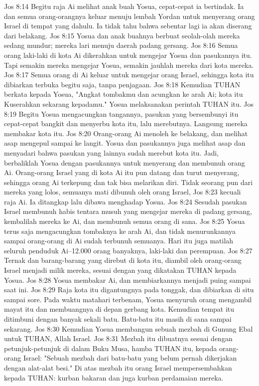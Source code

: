Jos 8:14  Begitu raja Ai melihat anak buah Yosua, cepat-cepat ia bertindak. Ia dan semua orang-orangnya keluar menuju lembah Yordan untuk menyerang orang Israel di tempat yang dahulu. Ia tidak tahu bahwa sebentar lagi ia akan diserang dari belakang.
Jos 8:15  Yosua dan anak buahnya berbuat seolah-olah mereka sedang mundur; mereka lari menuju daerah padang gersang.
Jos 8:16  Semua orang laki-laki di kota Ai dikerahkan untuk mengejar Yosua dan pasukannya itu. Tapi semakin mereka mengejar Yosua, semakin jauhlah mereka dari kota mereka.
Jos 8:17  Semua orang di Ai keluar untuk mengejar orang Israel, sehingga kota itu dibiarkan terbuka begitu saja, tanpa penjagaan.
Jos 8:18  Kemudian TUHAN berkata kepada Yosua, "Angkat tombakmu dan acungkan ke arah Ai; kota itu Kuserahkan sekarang kepadamu." Yosua melaksanakan perintah TUHAN itu.
Jos 8:19  Begitu Yosua mengacungkan tangannya, pasukan yang bersembunyi itu cepat-cepat bangkit dan menyerbu kota itu, lalu merebutnya. Langsung mereka membakar kota itu.
Jos 8:20  Orang-orang Ai menoleh ke belakang, dan melihat asap mengepul sampai ke langit. Yosua dan pasukannya juga melihat asap dan menyadari bahwa pasukan yang lainnya sudah merebut kota itu. Jadi, berbaliklah Yosua dengan pasukannya untuk menyerang dan membunuh orang Ai. Orang-orang Israel yang di kota Ai itu pun datang dan turut menyerang, sehingga orang Ai terkepung dan tak bisa melarikan diri. Tidak seorang pun dari mereka yang lolos, semuanya mati dibunuh oleh orang Israel,
Jos 8:23  kecuali raja Ai. Ia ditangkap lalu dibawa menghadap Yosua.
Jos 8:24  Sesudah pasukan Israel membunuh habis tentara musuh yang mengejar mereka di padang gersang, kembalilah mereka ke Ai, dan membunuh semua orang di sana.
Jos 8:25  Yosua terus saja mengacungkan tombaknya ke arah Ai, dan tidak menurunkannya sampai orang-orang di Ai sudah terbunuh semuanya. Hari itu juga matilah seluruh penduduk Ai--12.000 orang banyaknya, laki-laki dan perempuan.
Jos 8:27  Ternak dan barang-barang yang direbut di kota itu, diambil oleh orang-orang Israel menjadi milik mereka, sesuai dengan yang dikatakan TUHAN kepada Yosua.
Jos 8:28  Yosua membakar Ai, dan membiarkannya menjadi puing sampai saat ini.
Jos 8:29  Raja kota itu digantungnya pada tonggak, dan dibiarkan di situ sampai sore. Pada waktu matahari terbenam, Yosua menyuruh orang mengambil mayat itu dan membuangnya di depan gerbang kota. Kemudian tempat itu ditimbuni dengan banyak sekali batu. Batu-batu itu masih di sana sampai sekarang.
Jos 8:30  Kemudian Yosua membangun sebuah mezbah di Gunung Ebal untuk TUHAN, Allah Israel.
Jos 8:31  Mezbah itu dibuatnya sesuai dengan petunjuk-petunjuk di dalam Buku Musa, hamba TUHAN itu, kepada orang-orang Israel: "Sebuah mezbah dari batu-batu yang belum pernah dikerjakan dengan alat-alat besi." Di atas mezbah itu orang Israel mempersembahkan kepada TUHAN: kurban bakaran dan juga kurban perdamaian mereka.
